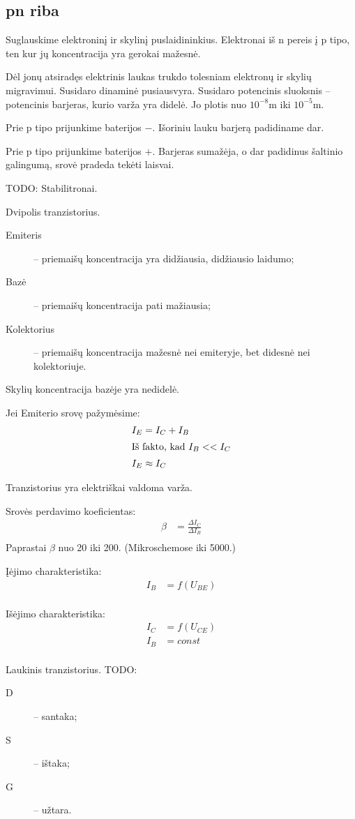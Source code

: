 \subsection{pn riba}

Suglauskime elektroninį ir skylinį puslaidininkius. Elektronai iš n
pereis į p tipo, ten kur jų koncentracija yra gerokai mažesnė.

Dėl jonų atsiradęs elektrinis laukas trukdo tolesniam elektronų ir
skylių migravimui. Susidaro dinaminė pusiausvyra. Susidaro potencinis
sluoksnis – potencinis barjeras, kurio varža yra didelė. Jo plotis
nuo $10^{-8}$m iki $10^{-5}$m.

Prie p tipo prijunkime baterijos $-$. Išoriniu lauku barjerą padidiname
dar.

Prie p tipo prijunkime baterijos $+$. Barjeras sumažėja, o dar padidinus
šaltinio galingumą, srovė pradeda tekėti laisvai.

TODO: Stabilitronai.

Dvipolis tranzistorius.
\begin{description}
  \item[Emiteris] – priemaišų koncentracija yra didžiausia, didžiausio
    laidumo;
  \item[Bazė] – priemaišų koncentracija pati mažiausia;
  \item[Kolektorius] – priemaišų koncentracija mažesnė nei emiteryje, bet
    didesnė nei kolektoriuje.
\end{description}

Skylių koncentracija bazėje yra nedidelė.

Jei Emiterio srovę pažymėsime:
\begin{align*}
  I_{E} &= I_{C} + I_{B} \\
  \intertext{Iš fakto, kad $I_{B} << I_{C}$}
  I_{E} &\approx I_{C} \\
\end{align*}

Tranzistorius yra elektriškai valdoma varža.

Srovės perdavimo koeficientas:
\begin{align*}
  \beta &= \frac{\Delta I_{C}}{\Delta I_{B}} \\
\end{align*}
Paprastai $\beta$ nuo 20 iki 200. (Mikroschemose iki 5000.)

Įėjimo charakteristika:
\begin{align*}
  I_{B} &= f(U_{BE}) \\
\end{align*}

Išėjimo charakteristika:
\begin{align*}
  I_{C} &= f(U_{CE}) \\
  I_{B} &= const \\
\end{align*}

Laukinis tranzistorius. TODO:
\begin{description}
  \item[D] – santaka;
  \item[S] – ištaka;
  \item[G] – užtara.
\end{description}
